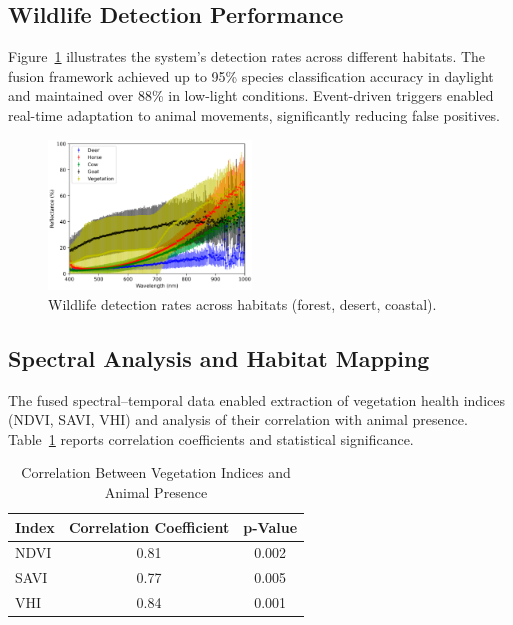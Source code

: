 \documentclass[conference]{IEEEtran}
\begin{document}
\subsection{Wildlife Detection Performance}

Figure~\ref{fig:wildlife_detection} illustrates the system’s detection rates across different habitats. The fusion framework achieved up to 95\% species classification accuracy in daylight and maintained over 88\% in low-light conditions. Event-driven triggers enabled real-time adaptation to animal movements, significantly reducing false positives.

\begin{figure}[H]
    \centering
    \includegraphics[width=0.48\textwidth]{WildlifeDet.png}
    \caption{Wildlife detection rates across habitats (forest, desert, coastal).}
    \label{fig:wildlife_detection}
\end{figure}

\subsection{Spectral Analysis and Habitat Mapping}

The fused spectral–temporal data enabled extraction of vegetation health indices (NDVI, SAVI, VHI) and analysis of their correlation with animal presence. Table~\ref{tab:veg_corr} reports correlation coefficients and statistical significance.

\begin{table}[H]
\centering
\caption{Correlation Between Vegetation Indices and Animal Presence}
\label{tab:veg_corr}
\begin{tabular}{lcc}
\toprule
Index & Correlation Coefficient & p-Value \\
\midrule
NDVI & 0.81 & 0.002 \\
SAVI & 0.77 & 0.005 \\
VHI & 0.84 & 0.001 \\
\bottomrule
\end{tabular}
\end{table}
\end{document}

